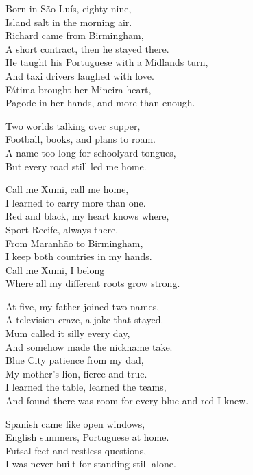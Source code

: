 \begin{lyrics}
Born in São Luís, eighty-nine,\\
Island salt in the morning air.\\
Richard came from Birmingham,\\
A short contract, then he stayed there.\\
He taught his Portuguese with a Midlands turn,\\
And taxi drivers laughed with love.\\
Fátima brought her Mineira heart,\\
Pagode in her hands, and more than enough.

Two worlds talking over supper,\\
Football, books, and plans to roam.\\
A name too long for schoolyard tongues,\\
But every road still led me home.

Call me Xumi, call me home,\\
I learned to carry more than one.\\
Red and black, my heart knows where,\\
Sport Recife, always there.\\
From Maranhão to Birmingham,\\
I keep both countries in my hands.\\
Call me Xumi, I belong\\
Where all my different roots grow strong.

At five, my father joined two names,\\
A television craze, a joke that stayed.\\
Mum called it silly every day,\\
And somehow made the nickname take.\\
Blue City patience from my dad,\\
My mother’s lion, fierce and true.\\
I learned the table, learned the teams,\\
And found there was room for every blue and red I knew.

Spanish came like open windows,\\
English summers, Portuguese at home.\\
Futsal feet and restless questions,\\
I was never built for standing still alone.


\end{lyrics}
